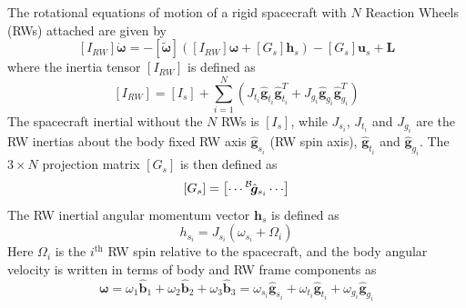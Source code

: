\documentclass[]{BasiliskReportMemo}
\begin{document}
The rotational equations of motion of a rigid spacecraft with $N$ Reaction Wheels (RWs) attached are given by\cite{schaub}
\begin{equation}
	\label{eq:MS:2}
	[I_{RW}] \dot{\bm \omega} = - [\tilde{\bm \omega}] \left( 
	[I_{RW}] \bm\omega + [G_{s}] \bm h_{s} 
	\right) - [G_{s}] \bm u_{s} + \bm L
\end{equation}
where  the inertia tensor $[I_{RW}]$ is defined as
\begin{equation}
	\label{eq:MS:3}
	[I_{RW}] = [I_{s}] + \sum_{i=1}^{N} \left (J_{t_{i}} \hat{\bm g}_{t_{i}} \hat{\bm g}_{t_{i}}^{T} + J_{g_{i}} \hat{\bm g}_{g_{i}} \hat{\bm g}_{g_{i}}^{T}
	\right)
\end{equation}
The spacecraft inertial without the $N$ RWs is $[I_{s}]$, while $J_{s_{i}}$, $J_{t_{i}}$ and $J_{g_{i}}$ are the RW inertias about the body fixed RW axis $\hat{\bm g}_{s_{i}}$ (RW spin axis), $\hat{\bm g}_{t_{i}}$ and $\hat{\bm g}_{g_{i}}$.  The $3\times N$ projection matrix $[G_{s}]$ is then defined as
\begin{equation}
	\label{eq:MS:4}
	[G_{s}] = \begin{bmatrix}
		\cdots \leftexp{B}{\hat{\bm g}}_{s_{i}} \cdots
	\end{bmatrix}
\end{equation}
The RW inertial angular momentum vector $\bm h_{s}$ is defined as
\begin{equation}
	\label{eq:MS:5}
	h_{s_{i}} = J_{s_{i}} (\omega_{s_{i}} + \Omega_{i})
\end{equation}
Here $\Omega_{i}$ is the $i^{\text{th}}$ RW spin relative to the spacecraft, and the body angular velocity is written in terms of body and RW frame components as
\begin{equation}
	\label{eq:MS:6}
	\bm\omega = \omega_{1} \hat{\bm b}_{1} + \omega_{2} \hat{\bm b}_{2} + \omega_{3} \hat{\bm b}_{3}
	= \omega_{s_{i}} \hat{\bm g}_{s_{i}} +  \omega_{t_{i}} \hat{\bm g}_{t_{i}} +  \omega_{g_{i}} \hat{\bm g}_{g_{i}}
\end{equation}
\end{document}
